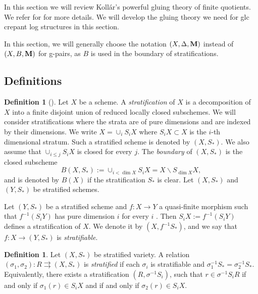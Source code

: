 \documentclass[11pt]{amsart}
\numberwithin{equation}{section}
\newcommand{\Mm}{{\bf{M}}}
\theoremstyle{definition}
\newtheorem{defn}[thm]{Definition}
\theoremstyle{definition}
\theoremstyle{definition}
\begin{document}
In this section we will review Koll\'ar’s powerful gluing theory of
finite quotients. We refer for \cite[Section 5, Section 9]{Kol13} for
more details. We will develop the gluing theory we need for glc
crepant log structures in this section.

In this section, we will generally choose the notation
$(X,\Delta,\Mm)$ instead of $(X,B,\Mm)$ for g-pairs, as $B$ is used
in the boundary of stratifications.

\subsection{Definitions}

\begin{defn}[{\cite[Definition 9.15]{Kol13}}]
  Let $X$ be a scheme. A {\it stratification} of $X$ is a
  decomposition of $X$ into a finite disjoint union of reduced
  locally closed subschemes. We will consider stratifications where
  the strata are of pure dimensions
  and are indexed by their dimensions. We write $X=\cup_{i}S_iX$
  where $S_iX\subset X$ is the $i$-th
  dimensional stratum. Such a stratified scheme is denoted by $(X,S_*)$. We also
  assume that $\cup_{i\le j}S_iX$ is closed for every $j$. The {\it
  boundary} of $(X,S_*)$ is the closed subscheme
  $$
  B(X,S_*):=\cup_{i<\dim X}S_iX=X\backslash S_{\dim X}X,
  $$
  and is denoted by $B(X)$ if the stratification $S_*$ is clear. Let
  $(X, S_*)$ and $(Y, S_*)$ be stratified schemes.

  Let $(Y, S_*)$ be a stratified scheme and $f:X\to Y$ a quasi-finite
  morphism such that $f^{-1} (S_iY)$ has pure dimension $i$ for every
  $i$ . Then $S_iX:=f^{-1}(S_iY)$ defines a stratification of $X$. We
  denote it by $(X,f^{-1}S_*)$, and we say that $f:X\to(Y,S_*)$ is
  \emph{stratifiable}.
\end{defn}

\begin{defn}
  Let $(X, S_*)$ be stratified variety. A relation
  $(\sigma_1,\sigma_2): R\rightrightarrows (X,S_*)$ is {\it
  stratified} if each $\sigma_i$ is stratifiable and
  $\sigma_1^{-1}S_*=\sigma_2^{-1}S_*$. Equivalently,
  there exists a stratification $(R,\sigma^{-1}S_i)$, such that
  $r\in\sigma^{-1}S_iR$ if and only if $\sigma_1(r)\in S_iX$ and if
  and only if $\sigma_2(r)\in S_iX$.
\end{defn}
\end{document}
